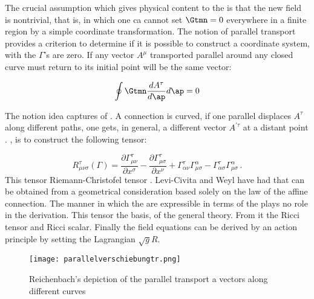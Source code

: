 {The crucial assumption which gives physical content to the  is that the new field is nontrivial, that is, in which one ca cannot set $\Gtmn=0$ everywhere in a finite region by a simple coordinate transformation. The notion of parallel transport provides a criterion to determine if it is possible to construct a coordinate system, with the $\Gamma$'s are zero. If any vector $A^{\mu}$ transported parallel around any closed curve must return to its initial point will be the same vector:

$$
\oint \Gtmn \frac{d A^{\tau}}{d \ap} d \ap=0
$$

The notion idea captures of . A connection is curved, if one parallel displaces $A^\tau$ along different paths, one gets, in general, a different vector $A^{\prime \tau}$ at a distant point \citep[028-01-03, 37]{HR}.  , is to construct the following tensor:

\begin{equation}\label{eq:riemanntensorgamma}
R_{\mu \nu \sigma}^{\tau}(\Gamma)=\frac{\partial \Gamma_{\mu \nu}^{\tau}}{\partial x^{\sigma}}-\frac{\partial \Gamma_{\mu \sigma}^{\tau}}{\partial x^{\nu}}+\Gamma_{\alpha \nu}^{\tau} \Gamma_{\mu \sigma}^{\alpha}-\Gamma_{\alpha \sigma}^{\tau} \Gamma_{\mu\sigma}^{\alpha}\,.	
\end{equation}
%
This tensor Riemann-Christofel tensor \riteg. Levi-Civita and Weyl have had that can be obtained from a geometrical consideration based solely on the law of the affine connection. The manner in which the \Gtmn are expressible in terms of the \gmn plays no role in the derivation. This tensor the basis, of the general theory. From it the Ricci tensor and Ricci scalar. Finally the field equations can be derived by an action principle by setting the Lagrangian $ \sqrt{g}R$.

\begin{figure}
\begin{center}
\texttt{[image: parallelverschiebungtr.png]}
\caption{Reichenbach's depiction of the parallel transport a vectors along different curves}
\end{center}
\end{figure}


}
